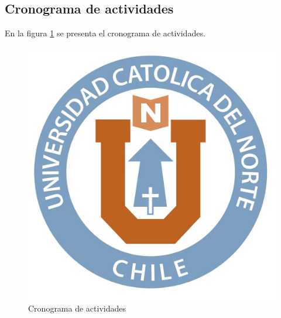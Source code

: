 \documentclass[oneside,12pt, letterpaper, titlepage]{book}
\begin{document}
\begin{landscape}


\section{Cronograma de actividades}
En la figura \ref{fig:crono} se presenta el cronograma de actividades.
\begin{figure}[H]
\centering
\includegraphics[scale=.4]{images/u.jpg}
\caption{Cronograma de actividades}
\label{fig:crono}
\end{figure}
\end{landscape}
\renewcommand\bibname{BIBLIOGRAFÍA}

%
{}

    
\end{document}

